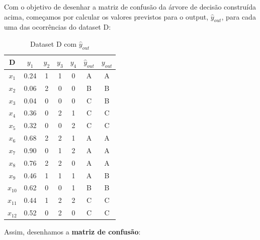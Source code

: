 \documentclass{article}
\begin{document}
Com o objetivo de desenhar a matriz de confusão da árvore de decisão construída acima, começamos por calcular os valores previstos para o output, $\hat{y}_{out}$, para cada uma das ocorrências do dataset D:

\begin{table}[h!]
  \centering
  \begin{tabular}{|c|c|c|c|c|c|c|}
    \hline
        D     & $y_1$ & $y_2$ & $y_3$ & $y_4$ & $\hat{y}_{out}$ & $y_{out}$ \\ \hline
        $x_1$ & 0.24   & 1     & 1     & 0     & A         & A         \\ \hline
        $x_2$ & 0.06   & 2     & 0     & 0     & B         & B         \\ \hline
        $x_3$ & 0.04   & 0     & 0     & 0     & C         & B         \\ \hline
        $x_4$ & 0.36   & 0     & 2     & 1     & C         & C         \\ \hline
        $x_5$ & 0.32   & 0     & 0     & 2     & C         & C         \\ \hline
        $x_6$ & 0.68   & 2     & 2     & 1     & A         & A         \\ \hline
        $x_7$ & 0.90   & 0     & 1     & 2     & A         & A         \\ \hline
        $x_8$ & 0.76   & 2     & 2     & 0     & A         & A         \\ \hline
        $x_9$ & 0.46   & 1     & 1     & 1     & A         & B         \\ \hline
        $x_{10}$ & 0.62   & 0     & 0     & 1     & B         & B         \\ \hline
        $x_{11}$ & 0.44   & 1     & 2     & 2     & C         & C         \\ \hline
        $x_{12}$ & 0.52   & 0     & 2     & 0     & C         & C         \\ \hline
    \end{tabular}
  \caption{Dataset D com $\hat{y}_{out}$}
  \label{tab:datasetD_comprev}
\end{table}

Assim, desenhamos a \textbf{matriz de confusão}:
\end{document}
